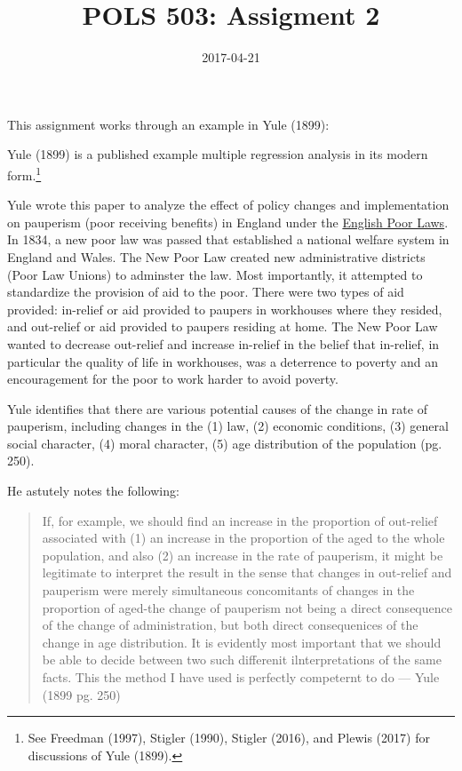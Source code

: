 \documentclass[]{article}
\title{POLS 503: Assigment 2}
\author{}
\date{2017-04-21}
\let\rmarkdownfootnote\footnote%
\def\footnote{\protect\rmarkdownfootnote}
\begin{document}
\maketitle

This assignment works through an example in Yule (1899):

Yule (1899) is a published example multiple regression analysis in its
modern form.\footnote{See Freedman (1997), Stigler (1990), Stigler
  (2016), and Plewis (2017) for discussions of Yule (1899).}

Yule wrote this paper to analyze the effect of policy changes and
implementation on pauperism (poor receiving benefits) in England under
the \href{https://en.wikipedia.org/wiki/English_Poor_Laws}{English Poor
Laws}. In 1834, a new poor law was passed that established a national
welfare system in England and Wales. The New Poor Law created new
administrative districts (Poor Law Unions) to adminster the law. Most
importantly, it attempted to standardize the provision of aid to the
poor. There were two types of aid provided: in-relief or aid provided to
paupers in workhouses where they resided, and out-relief or aid provided
to paupers residing at home. The New Poor Law wanted to decrease
out-relief and increase in-relief in the belief that in-relief, in
particular the quality of life in workhouses, was a deterrence to
poverty and an encouragement for the poor to work harder to avoid
poverty.

Yule identifies that there are various potential causes of the change in
rate of pauperism, including changes in the (1) law, (2) economic
conditions, (3) general social character, (4) moral character, (5) age
distribution of the population (pg. 250).

He astutely notes the following:

\begin{quote}
If, for example, we should find an increase in the proportion of
out-relief associated with (1) an increase in the proportion of the aged
to the whole population, and also (2) an increase in the rate of
pauperism, it might be legitimate to interpret the result in the sense
that changes in out-relief and pauperism were merely simultaneous
concomitants of changes in the proportion of aged-the change of
pauperism not being a direct consequence of the change of
administration, but both direct consequenices of the change in age
distribution. It is evidently most important that we should be able to
decide between two such differenit ilnterpretations of the same facts.
This the method I have used is perfectly competernt to do --- Yule (1899
pg. 250)
\end{quote}
\end{document}
